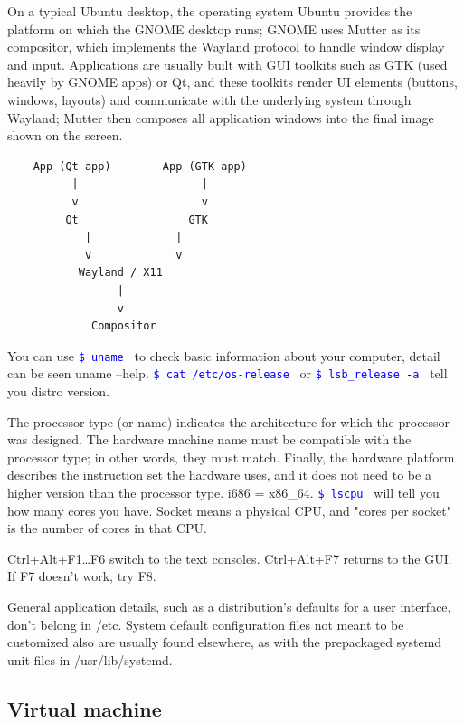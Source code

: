 \documentclass[paper=8.5in:11in, twoside, 12pt, pagesize=pdftex]{book}
\newcommand{\linuxcommand}[1]{\texttt{\textcolor{blue}{\$ #1 \Pisymbol{psy}{191}}}}
\begin{document}
	\par On a typical Ubuntu desktop, the operating system Ubuntu provides the platform on which the GNOME desktop runs; GNOME uses Mutter as its compositor, which implements the Wayland protocol to handle window display and input. Applications are usually built with GUI toolkits such as GTK (used heavily by GNOME apps) or Qt, and these toolkits render UI elements (buttons, windows, layouts) and communicate with the underlying system through Wayland; Mutter then composes all application windows into the final image shown on the screen.
\begin{lstlisting}
	App (Qt app)        App (GTK app)
	      |                   |
	      v                   v
	     Qt                 GTK
	        |             |
	        v             v
	       Wayland / X11
	             |
	             v
	         Compositor
\end{lstlisting}	

	\par You can use \linuxcommand{uname} to check basic information about your computer, detail can be seen uname --help. \linuxcommand{cat /etc/os-release} or \linuxcommand{lsb\_release -a} tell you distro version.

	\par The processor type (or name) indicates the architecture for which the processor was designed. The hardware machine name must be compatible with the processor type; in other words, they must match. Finally, the hardware platform describes the instruction set the hardware uses, and it does not need to be a higher version than the processor type. i686 = x86\_64. \linuxcommand{lscpu} will tell you how many cores you have. Socket means a physical CPU, and "cores per socket" is the number of cores in that CPU.

	\par Ctrl+Alt+F1\ldots F6 switch to the text consoles. Ctrl+Alt+F7 returns to the GUI. If F7 doesn't work, try F8.

	\par General application details, such as a distribution’s defaults for a user interface, don’t belong in /etc. System default configuration files not meant to be customized also are usually found elsewhere, as with the prepackaged systemd unit files in /usr/lib/systemd.
	



\subsection{Virtual machine}
\end{document}
